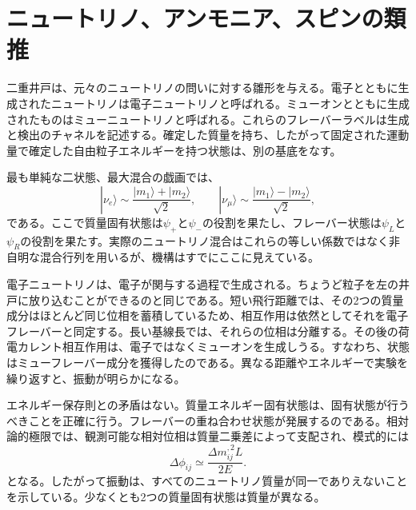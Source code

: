 \section{ニュートリノ、アンモニア、スピンの類推}

二重井戸は、元々のニュートリノの問いに対する雛形を与える。電子とともに生成されたニュートリノは電子ニュートリノと呼ばれる。ミューオンとともに生成されたものはミューニュートリノと呼ばれる。これらのフレーバーラベルは生成と検出のチャネルを記述する。確定した質量を持ち、したがって固定された運動量で確定した自由粒子エネルギーを持つ状態は、別の基底をなす。

最も単純な二状態、最大混合の戯画では、
\begin{equation}
|\nu_e\rangle \sim \frac{|m_1\rangle+|m_2\rangle}{\sqrt{2}},
\qquad
|\nu_\mu\rangle \sim \frac{|m_1\rangle-|m_2\rangle}{\sqrt{2}},
\end{equation}
である。ここで質量固有状態は\(\psi_+\)と\(\psi_-\)の役割を果たし、フレーバー状態は\(\psi_L\)と\(\psi_R\)の役割を果たす。実際のニュートリノ混合はこれらの等しい係数ではなく非自明な混合行列を用いるが、機構はすでにここに見えている。

電子ニュートリノは、電子が関与する過程で生成される。ちょうど粒子を左の井戸に放り込むことができるのと同じである。短い飛行距離では、その2つの質量成分はほとんど同じ位相を蓄積しているため、相互作用は依然としてそれを電子フレーバーと同定する。長い基線長では、それらの位相は分離する。その後の荷電カレント相互作用は、電子ではなくミューオンを生成しうる。すなわち、状態はミューフレーバー成分を獲得したのである。異なる距離やエネルギーで実験を繰り返すと、振動が明らかになる。

エネルギー保存則との矛盾はない。質量エネルギー固有状態は、固有状態が行うべきことを正確に行う。フレーバーの重ね合わせ状態が発展するのである。相対論的極限では、観測可能な相対位相は質量二乗差によって支配され、模式的には
\begin{equation}
\Delta\phi_{ij}\simeq \frac{\Delta m_{ij}^{,2}L}{2E}.
\end{equation}
となる。したがって振動は、すべてのニュートリノ質量が同一でありえないことを示している。少なくとも2つの質量固有状態は質量が異なる。

\begin{classroomqa}
\end{classroomqa}

